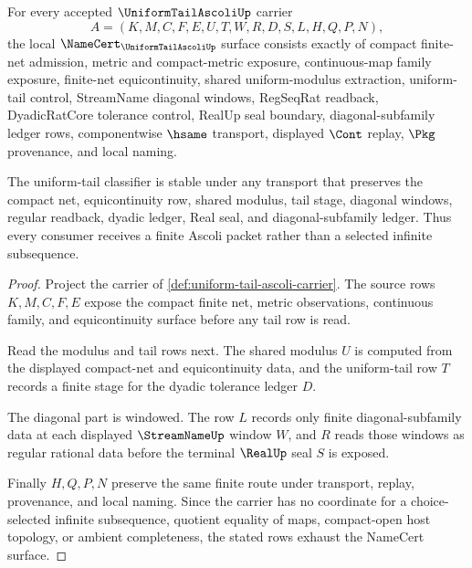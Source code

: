 \begin{theorem}\label{thm:uniform-tail-ascoli-namecert}
For every accepted $\UniformTailAscoliUp$ carrier
$$
A=(K,M,C,F,E,U,T,W,R,D,S,L,H,Q,P,N),
$$
the local $\NameCert_{\UniformTailAscoliUp}$ surface consists exactly of compact finite-net admission, metric and compact-metric exposure, continuous-map family exposure, finite-net equicontinuity, shared uniform-modulus extraction, uniform-tail control, StreamName diagonal windows, RegSeqRat readback, DyadicRatCore tolerance control, RealUp seal boundary, diagonal-subfamily ledger rows, componentwise $\hsame$ transport, displayed $\Cont$ replay, $\Pkg$ provenance, and local naming.

The uniform-tail classifier is stable under any transport that preserves the compact net, equicontinuity row, shared modulus, tail stage, diagonal windows, regular readback, dyadic ledger, Real seal, and diagonal-subfamily ledger. Thus every consumer receives a finite Ascoli packet rather than a selected infinite subsequence.
\end{theorem}
\begin{proof}
Project the carrier of \autoref{def:uniform-tail-ascoli-carrier}. The source rows $K,M,C,F,E$ expose the compact finite net, metric observations, continuous family, and equicontinuity surface before any tail row is read.

Read the modulus and tail rows next. The shared modulus $U$ is computed from the displayed compact-net and equicontinuity data, and the uniform-tail row $T$ records a finite stage for the dyadic tolerance ledger $D$.

The diagonal part is windowed. The row $L$ records only finite diagonal-subfamily data at each displayed $\StreamNameUp$ window $W$, and $R$ reads those windows as regular rational data before the terminal $\RealUp$ seal $S$ is exposed.

Finally $H,Q,P,N$ preserve the same finite route under transport, replay, provenance, and local naming. Since the carrier has no coordinate for a choice-selected infinite subsequence, quotient equality of maps, compact-open host topology, or ambient completeness, the stated rows exhaust the NameCert surface.
\end{proof}


